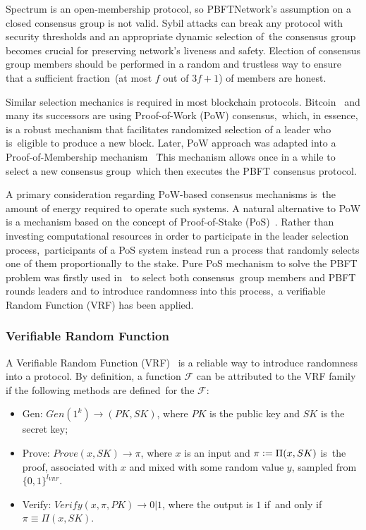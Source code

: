 Spectrum is an open-membership protocol, so PBFTNetwork's assumption on a closed consensus group is not valid.
Sybil attacks can break any protocol with security thresholds and an appropriate dynamic selection of\
the consensus group becomes crucial for preserving network's liveness and safety.
Election of consensus group members should be performed in a random and trustless way to ensure that a sufficient fraction\
(at most $f$ out of ${3 f + 1}$) of members are honest.

Similar selection mechanics is required in most blockchain protocols.
Bitcoin~\cite{nakamoto2009bitcoin} and many its successors are using Proof-of-Work (PoW) consensus,\
which, in essence, is a robust mechanism that facilitates randomized selection of a leader who is\
eligible to produce a new block.
Later, PoW approach was adapted into a Proof-of-Membership mechanism ~\cite{kokoriskogias2016enhancing}\.
This mechanism allows once in a while to select a new consensus group\
which then executes the PBFT consensus protocol.

A primary consideration regarding PoW-based consensus mechanisms is\
the amount of energy required to operate such systems.
A natural alternative to PoW is a mechanism based on the concept of Proof-of-Stake (PoS)~\cite{King2012PPCoinPC}.
Rather than investing computational resources in order to participate in the leader selection process,\
participants of a PoS system instead run a process that randomly selects one of them proportionally to the stake.
Pure PoS mechanism to solve the PBFT problem was firstly used in~\cite{cryptoeprint:2017/454} to select both consensus\
group members and PBFT rounds leaders and to introduce randomness into this process,\
a verifiable Random Function (VRF) has been applied.

\subsubsection{Verifiable Random Function}

A Verifiable Random Function (VRF)~\cite{Micali1999} is a reliable way to introduce randomness into a protocol.
By definition, a function $\mathcal{F}$ can be attributed to the VRF family if the following methods are defined\
for the $\mathcal{F}$:
\begin{itemize}
    \item Gen: ${Gen(1^k) \rightarrow (PK, SK)}$, where $PK$ is the public key and $SK$ is the secret key;
    \item Prove: ${Prove(x, SK) \rightarrow \pi}$, where $x$ is an input and $\pi \vcentcolon= \Pi(x, SK)$ is\
    the proof, associated with $x$ and mixed with some random value $y$, sampled from $\{0,1\}^{l_{VRF}}$.
    \item Verify: ${Verify(x, \pi, PK) \rightarrow 0 | 1}$, where the output is $1$ if\
    and only if ${\pi \equiv \Pi(x, SK)}$.
\end{itemize}

